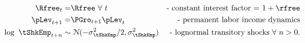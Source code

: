   \begin{equation}\begin{gathered}\begin{aligned}
    \Rfree_{t}   = & \Rfree~\forall~t & \text{- constant interest factor = $1+\rfree$}
    \\ \pLev_{t+1}  = & \PGro_{t+1}\pLev_{t} &   \text{- permanent labor income dynamics} \label{eq:permincgrow}
    \\ \log ~ \tShkEmp_{t+n} \sim &  ~\mathcal{N}(-\sigma_{\tShkEmp}^{2}/2,\sigma_{\tShkEmp}^{2}) & \text{- lognormal transitory shocks}~\forall~n>0
                                                                                                    \label{eq:epsdist}
                                                                                                    .
  \end{aligned}\end{gathered}\end{equation}
